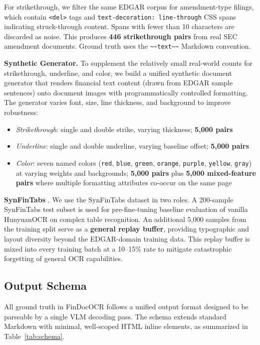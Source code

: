 \documentclass[10pt,twocolumn]{article}
\begin{document}
For strikethrough, we filter the same EDGAR corpus for amendment-type filings,
which contain \texttt{<del>} tags and \texttt{text-decoration:~line-through} CSS
spans indicating struck-through content. Spans with fewer than 10 characters are
discarded as noise. This produces \textbf{446 strikethrough pairs} from real SEC
amendment documents. Ground truth uses the
\texttt{\textasciitilde\textasciitilde{}text\textasciitilde\textasciitilde}
Markdown convention.

\textbf{Synthetic Generator.} To supplement the relatively small real-world
counts for strikethrough, underline, and color, we build a unified synthetic
document generator that renders financial text content (drawn from EDGAR sample
sentences) onto document images with programmatically controlled formatting. The
generator varies font, size, line thickness, and background to improve
robustness:
\begin{itemize}
  \item \textit{Strikethrough}: single and double strike, varying thickness;
    \textbf{5{,}000 pairs}
  \item \textit{Underline}: single and double underline, varying baseline offset;
    \textbf{5{,}000 pairs}
  \item \textit{Color}: seven named colors (\texttt{red}, \texttt{blue},
    \texttt{green}, \texttt{orange}, \texttt{purple}, \texttt{yellow},
    \texttt{gray}) at varying weights and backgrounds; \textbf{5{,}000 pairs}
    plus \textbf{5{,}000 mixed-feature pairs} where multiple formatting attributes
    co-occur on the same page
\end{itemize}

\textbf{SynFinTabs} \cite{bradley2024synfintabs}. We use the SynFinTabs dataset
in two roles. A 200-sample SynFinTabs test subset is used for pre-fine-tuning
baseline evaluation of vanilla HunyuanOCR on complex table recognition. An
additional 5{,}000 samples from the training split serve as a \textbf{general
replay buffer}, providing typographic and layout diversity beyond the
EDGAR-domain training data. This replay buffer is mixed into every training
batch at a 10--15\% rate to mitigate catastrophic forgetting of general OCR
capabilities.

\subsection{Output Schema}
\label{sec:dataset:schema}

All ground truth in FinDocOCR follows a unified output format designed to be
parseable by a single VLM decoding pass. The schema extends standard Markdown
with minimal, well-scoped HTML inline elements, as summarized in
Table~\ref{tab:schema}.
\end{document}
